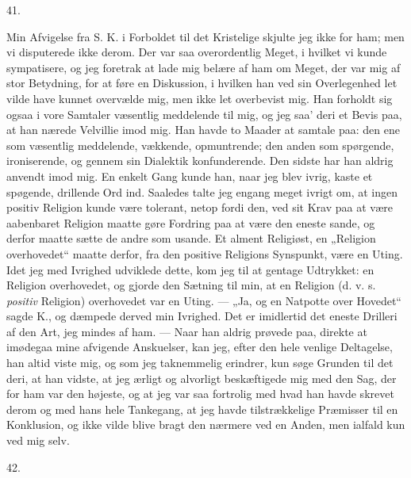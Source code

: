 \documentclass[12pt,a4paper,openany]{book}
\newcommand{\secnum}[1]{\par\begin{center}#1\end{center}\par\nobreak}
\newcommand{\opage}[1]{\marginnote{\footnotesize\textit{[#1]}}}
\begin{document}
\secnum{41.}

Min Afvigelse fra S. K. i Forboldet til det Kristelige
skjulte jeg ikke for ham; men vi disputerede ikke
derom. Der var saa overordentlig Meget, i hvilket vi
kunde sympatisere, og jeg foretrak at lade mig belære
af ham om Meget, der var mig af stor Betydning,
for at føre en Diskussion, i hvilken han ved sin Overlegenhed
let vilde have kunnet overvælde mig, men ikke
let overbevist mig. Han forholdt sig ogsaa i vore Samtaler
væsentlig meddelende til mig, og jeg saa’ deri et
Bevis paa, at han nærede Velvillie imod mig. Han havde
to Maader at samtale paa: den ene som væsentlig meddelende,
vækkende, opmuntrende; den anden som spørgende,
ironiserende, og gennem sin Dialektik konfunderende.
Den sidste har han aldrig anvendt imod mig.
En enkelt Gang kunde han, naar jeg blev ivrig, kaste et
spøgende, drillende Ord ind. Saaledes talte jeg engang
meget ivrigt om, at ingen positiv Religion kunde være
tolerant, netop fordi den, ved sit Krav paa at være
aabenbaret Religion maatte gøre Fordring paa at være
den eneste sande, og derfor maatte sætte de andre som
usande. Et alment Religiøst, en „Religion overhovedet“
maatte derfor, fra den positive Religions Synspunkt, være
en Uting. Idet jeg med Ivrighed udviklede dette, kom
jeg til at gentage Udtrykket: en Religion overhovedet,
og gjorde den Sætning til min, at en Religion (d. v. s.
\emph{positiv} Religion) overhovedet var en Uting. — „Ja, og
en Natpotte over Hovedet“ sagde K., og dæmpede derved
min Ivrighed. Det er imidlertid det eneste Drilleri af
den Art, jeg mindes af ham. — Naar han aldrig prøvede
paa, direkte at imødegaa mine afvigende Anskuelser,
kan jeg, efter den hele venlige Deltagelse, han altid viste
mig, og som jeg taknemmelig erindrer, kun søge Grunden
\opage{367}til det deri, at han vidste, at jeg ærligt og alvorligt beskæftigede
mig med den Sag, der for ham var den højeste, og at jeg var saa fortrolig med
hvad han havde skrevet derom og med hans hele Tankegang, at jeg havde
tilstrækkelige Præmisser til en Konklusion, og ikke vilde blive bragt den
nærmere ved en Anden, men ialfald kun ved mig selv.

\secnum{42.}
\end{document}
